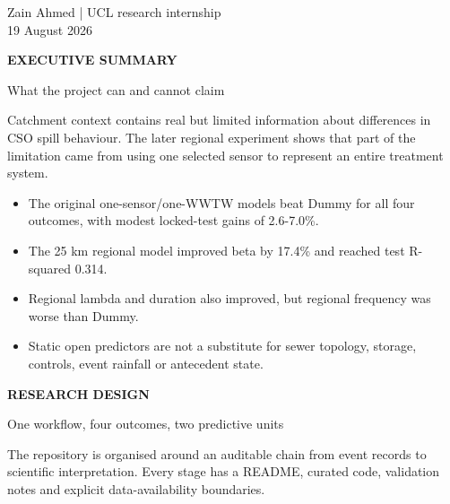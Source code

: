 \documentclass[10pt]{article}
\begin{document}
\begin{titlepage}\color{navy}\vspace*{35mm}{\Huge\bfseries CSO Spatial Drivers\par}\vspace{4mm}{\Large Repository walkthrough and evidence guide\par}\vfill Zain Ahmed | UCL research internship\\19 August 2026\end{titlepage}
\clearpage
{\color{teal}\small\bfseries EXECUTIVE SUMMARY}\par
{}\par
\small What the project can and cannot claim\par\vspace{5mm}
Catchment context contains real but limited information about differences in CSO spill behaviour. The later regional experiment shows that part of the limitation came from using one selected sensor to represent an entire treatment system.
\begin{itemize}[leftmargin=5mm]
\item The original one-sensor/one-WWTW models beat Dummy for all four outcomes, with modest locked-test gains of 2.6-7.0\%.
\item The 25 km regional model improved beta by 17.4\% and reached test R-squared 0.314.
\item Regional lambda and duration also improved, but regional frequency was worse than Dummy.
\item Static open predictors are not a substitute for sewer topology, storage, controls, event rainfall or antecedent state.
\end{itemize}
\vfill{}
\clearpage
{\color{teal}\small\bfseries RESEARCH DESIGN}\par
{}\par
\small One workflow, four outcomes, two predictive units\par\vspace{5mm}
The repository is organised around an auditable chain from event records to scientific interpretation. Every stage has a README, curated code, validation notes and explicit data-availability boundaries.
\end{document}
